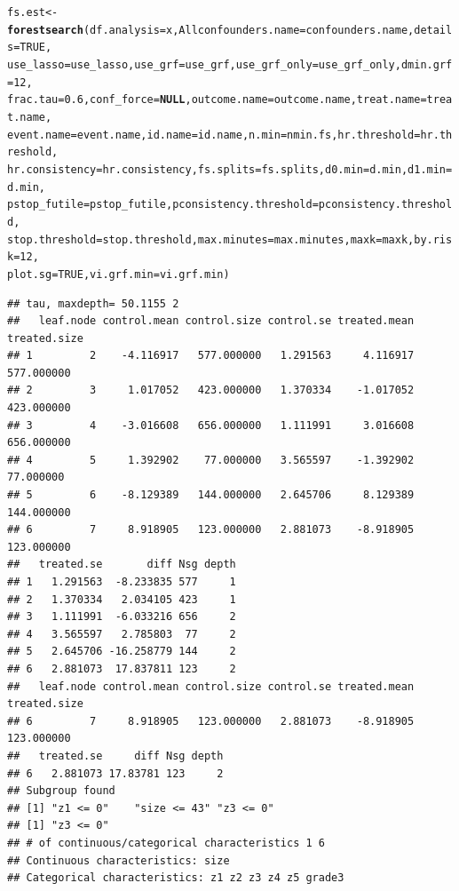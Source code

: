 \documentclass[smallextended]{svjour3}
\makeatletter
\newcommand{\hlnum}[1]{\textcolor[rgb]{0.686,0.059,0.569}{#1}}%
\newcommand{\hlstd}[1]{\textcolor[rgb]{0.345,0.345,0.345}{#1}}%
\newcommand{\hlkwa}[1]{\textcolor[rgb]{0.161,0.373,0.58}{\textbf{#1}}}%
\newcommand{\hlkwb}[1]{\textcolor[rgb]{0.69,0.353,0.396}{#1}}%
\newcommand{\hlkwc}[1]{\textcolor[rgb]{0.333,0.667,0.333}{#1}}%
\newcommand{\hlkwd}[1]{\textcolor[rgb]{0.737,0.353,0.396}{\textbf{#1}}}%
\newenvironment{kframe}{%
 \def\at@end@of@kframe{}%
 \ifinner\ifhmode%
  \def\at@end@of@kframe{\end{minipage}}%
  \begin{minipage}{\columnwidth}%
 \fi\fi%
 \def\FrameCommand##1{\hskip\@totalleftmargin \hskip-\fboxsep
 \colorbox{shadecolor}{##1}\hskip-\fboxsep
     \hskip-\linewidth \hskip-\@totalleftmargin \hskip\columnwidth}%
 \MakeFramed {\advance\hsize-\width
   \@totalleftmargin\z@ \linewidth\hsize
   \@setminipage}}%
 {\par\unskip\endMakeFramed%
 \at@end@of@kframe}
\newenvironment{knitrout}{}{} %
\makeatother
\begin{document}
\begin{knitrout}
\begin{kframe}
\begin{alltt}
\hlstd{fs.est} \hlkwb{<-} \hlkwd{forestsearch}\hlstd{(}\hlkwc{df.analysis} \hlstd{= x,} \hlkwc{Allconfounders.name} \hlstd{= confounders.name,} \hlkwc{details} \hlstd{=} \hlnum{TRUE}\hlstd{,}
    \hlkwc{use_lasso} \hlstd{= use_lasso,} \hlkwc{use_grf} \hlstd{= use_grf,} \hlkwc{use_grf_only} \hlstd{= use_grf_only,} \hlkwc{dmin.grf} \hlstd{=} \hlnum{12}\hlstd{,}
    \hlkwc{frac.tau} \hlstd{=} \hlnum{0.6}\hlstd{,} \hlkwc{conf_force} \hlstd{=} \hlkwa{NULL}\hlstd{,} \hlkwc{outcome.name} \hlstd{= outcome.name,} \hlkwc{treat.name} \hlstd{= treat.name,}
    \hlkwc{event.name} \hlstd{= event.name,} \hlkwc{id.name} \hlstd{= id.name,} \hlkwc{n.min} \hlstd{= nmin.fs,} \hlkwc{hr.threshold} \hlstd{= hr.threshold,}
    \hlkwc{hr.consistency} \hlstd{= hr.consistency,} \hlkwc{fs.splits} \hlstd{= fs.splits,} \hlkwc{d0.min} \hlstd{= d.min,} \hlkwc{d1.min} \hlstd{= d.min,}
    \hlkwc{pstop_futile} \hlstd{= pstop_futile,} \hlkwc{pconsistency.threshold} \hlstd{= pconsistency.threshold,}
    \hlkwc{stop.threshold} \hlstd{= stop.threshold,} \hlkwc{max.minutes} \hlstd{= max.minutes,} \hlkwc{maxk} \hlstd{= maxk,} \hlkwc{by.risk} \hlstd{=} \hlnum{12}\hlstd{,}
    \hlkwc{plot.sg} \hlstd{=} \hlnum{TRUE}\hlstd{,} \hlkwc{vi.grf.min} \hlstd{= vi.grf.min)}
\end{alltt}
\begin{verbatim}
## tau, maxdepth= 50.1155 2 
##   leaf.node control.mean control.size control.se treated.mean treated.size
## 1         2    -4.116917   577.000000   1.291563     4.116917   577.000000
## 2         3     1.017052   423.000000   1.370334    -1.017052   423.000000
## 3         4    -3.016608   656.000000   1.111991     3.016608   656.000000
## 4         5     1.392902    77.000000   3.565597    -1.392902    77.000000
## 5         6    -8.129389   144.000000   2.645706     8.129389   144.000000
## 6         7     8.918905   123.000000   2.881073    -8.918905   123.000000
##   treated.se       diff Nsg depth
## 1   1.291563  -8.233835 577     1
## 2   1.370334   2.034105 423     1
## 3   1.111991  -6.033216 656     2
## 4   3.565597   2.785803  77     2
## 5   2.645706 -16.258779 144     2
## 6   2.881073  17.837811 123     2
##   leaf.node control.mean control.size control.se treated.mean treated.size
## 6         7     8.918905   123.000000   2.881073    -8.918905   123.000000
##   treated.se     diff Nsg depth
## 6   2.881073 17.83781 123     2
## Subgroup found 
## [1] "z1 <= 0"    "size <= 43" "z3 <= 0"   
## [1] "z3 <= 0"
## # of continuous/categorical characteristics 1 6 
## Continuous characteristics: size 
## Categorical characteristics: z1 z2 z3 z4 z5 grade3 

\end{verbatim}
\end{kframe}
\end{knitrout}
\end{document}
